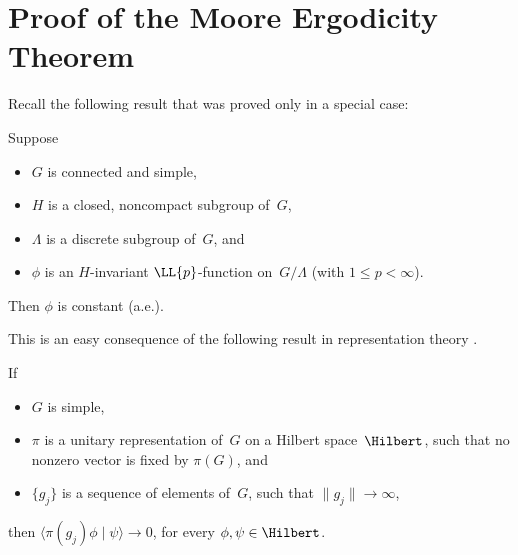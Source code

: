\begin{exercises}
\end{exercises}



\section{Proof of the Moore Ergodicity Theorem} \label{MooreErgPfSect}

Recall the following result that was proved only in a special case:

\begin{thm} \label{MooreErgBasicThmReprise}
Suppose
	\begin{itemize}
	\item $G$ is connected and simple,
	\item $H$ is a closed, noncompact subgroup of~$G$,
	\item $\Lambda$ is a discrete subgroup of~$G$,
	and
	\item $\phi$ is an $H$-invariant $\LL{p}$-function on~$G/\Lambda$ \textup(with $1 \le p < \infty$\textup).
	\end{itemize}
Then $\phi$ is constant\/ \textup(a.e.\textup).
\end{thm}

This is an easy consequence of the following result in representation theory . 

\begin{thm} \label{DecayMatCoeffSimple}
 If
 \begin{itemize}
 \item $G$ is simple,
 \item $\pi$ is a unitary representation of~$G$ on a Hilbert
space~$\Hilbert$, such that no nonzero vector is fixed by $\pi(G)$, and
 \item $\{g_j\}$ is a sequence of elements of~$G$, such that $\lVert g_j
\rVert \to \infty$,
 \end{itemize}
 then $\langle \pi(g_j) \phi \mid \psi \rangle \to 0$, for every $\phi,\psi \in \Hilbert$.
 \end{thm}

